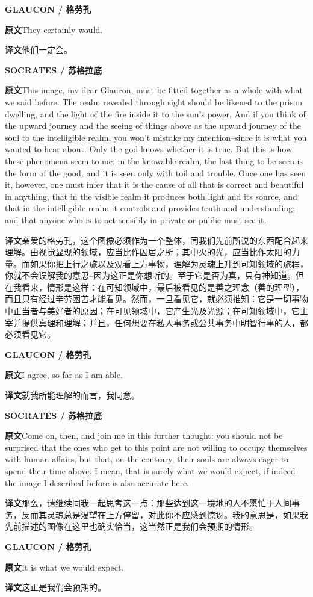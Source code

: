 \documentclass[UTF8,zihao=-4]{ctexart}
\newcommand{\BodyFont}{\fontsize{10.5pt}{15.5pt}\selectfont}
\newcommand{\origlabel}{\textbf{原文}\quad}
\newcommand{\translabel}{\textbf{译文}\quad}
\newenvironment{enblock}{\par\noindent\begingroup\BodyFont\origlabel}{\par\endgroup}
\newenvironment{zhblock}{\par\noindent\begingroup\BodyFont\translabel}{\par\endgroup\vspace{0.35em}}
\newcommand{\en}[1]{\begin{enblock}#1\end{enblock}}
\newcommand{\zh}[1]{\begin{zhblock}#1\end{zhblock}}
\newcommand{\speaker}[2]{\par\medskip\noindent\textbf{#1 / #2}\par}
\begin{document}
\speaker{GLAUCON}{格劳孔}
\en{They certainly would.}
\zh{他们一定会。}

\speaker{SOCRATES}{苏格拉底}
\en{This image, my dear Glaucon, must be fitted together as a whole with what we said before. The realm revealed through sight should be likened to the prison dwelling, and the light of the fire inside it to the sun's power. And if you think of the upward journey and the seeing of things above as the upward journey of the soul to the intelligible realm, you won't mistake my intention--since it is what you wanted to hear about. Only the god knows whether it is true. But this is how these phenomena seem to me: in the knowable realm, the last thing to be seen is the form of the good, and it is seen only with toil and trouble. Once one has seen it, however, one must infer that it is the cause of all that is correct and beautiful in anything, that in the visible realm it produces both light and its source, and that in the intelligible realm it controls and provides truth and understanding; and that anyone who is to act sensibly in private or public must see it.}
\zh{亲爱的格劳孔，这个图像必须作为一个整体，同我们先前所说的东西配合起来理解。由视觉显现的领域，应当比作囚居之所；其中火的光，应当比作太阳的力量。而如果你把上行之旅以及观看上方事物，理解为灵魂上升到可知领域的旅程，你就不会误解我的意思--因为这正是你想听的。至于它是否为真，只有神知道。但在我看来，情形是这样：在可知领域中，最后被看见的是善之理念（善的理型），而且只有经过辛劳困苦才能看见。然而，一旦看见它，就必须推知：它是一切事物中正当者与美好者的原因；在可见领域中，它产生光及光源；在可知领域中，它主宰并提供真理和理解；并且，任何想要在私人事务或公共事务中明智行事的人，都必须看见它。}

\speaker{GLAUCON}{格劳孔}
\en{I agree, so far as I am able.}
\zh{就我所能理解的而言，我同意。}

\speaker{SOCRATES}{苏格拉底}
\en{Come on, then, and join me in this further thought: you should not be surprised that the ones who get to this point are not willing to occupy themselves with human affairs, but that, on the contrary, their souls are always eager to spend their time above. I mean, that is surely what we would expect, if indeed the image I described before is also accurate here.}
\zh{那么，请继续同我一起思考这一点：那些达到这一境地的人不愿忙于人间事务，反而其灵魂总是渴望在上方停留，对此你不应感到惊讶。我的意思是，如果我先前描述的图像在这里也确实恰当，这当然正是我们会预期的情形。}

\speaker{GLAUCON}{格劳孔}
\en{It is what we would expect.}
\zh{这正是我们会预期的。}
\end{document}
